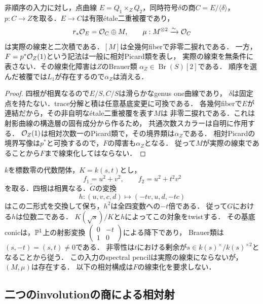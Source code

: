 \begin{lemma}
\label{lem:qa-spectral-relative-pencil-brauer}
非順序の入力に対し，点曲線
$E=Q_1\times_ZQ_2$，同時符号$\delta$の商$C=E/\langle\delta\rangle$，
$p:C\to Z$を取る．$E\to C$は有限\'etale二重被覆であり，
\[
 r_*\mathcal O_E=\mathcal O_C\oplus M,\qquad
 \mu:M^{\otimes2}\xrightarrow{\sim}\mathcal O_C
\]
は実際の線束と二次積である．$[M]$は全幾何fiberで非零二捩れである．
一方，$F=p^*\mathcal O_Z(1)$という記法は一般に相対Picard類を表し，
実際の線束を無条件に表さない．その線束化障害は$Z$のBrauer類
$\alpha_Z\in\operatorname{Br}(S)[2]$である．
順序を選んだ被覆では$L_1$が存在するので$\alpha_Z$は消える．
\end{lemma}
\begin{proof}
四根が相異なるので$E/S,C/S$は滑らかなgenus one曲線であり，
$\delta$は固定点を持たない．trace分解と積は任意基底変更に可換である．
各幾何fiberで$E$が連結だから，その非自明な\'etale二重被覆を表す$M$は
非零二捩れである．これは射影曲線の構造層の固有成分から作るため，
共通次数スカラーは自明に作用する．
$\mathcal O_Z(1)$は相対次数一のPicard類で，その境界類は$\alpha_Z$である．
相対Picardの境界写像は$p^*$と可換するので，$F$の障害も$\alpha_Z$となる．
従って$M$が実際の線束であることから$F$まで線束化してはならない．
\end{proof}

\begin{example}[pencilのBrauer障害が非零になる入力]
\label{ex:qa-spectral-relative-pencil-nonsplit}
$k$を標数零の代数閉体，$K=k(s,t)$とし，
\[
 f_1=u^2+v^2,\qquad f_2=u^2+t^2v^2
\]
を取る．四根は相異なる．$\widetilde G$の変換
\[
 h:(u,v,c,d)\longmapsto(-tv,u,d,-tc)
\]
はこの二形式を交換して保ち，$h^2$は全四変数への$-t$倍である．
従って$G$における$h$は位数二である．
$K(\sqrt{s})/K$と$h$によってこの対象をtwistする．
その基底conicは，$\mathbb P^1$上の射影変換
$\left(\begin{smallmatrix}0&-t\\1&0\end{smallmatrix}\right)$による降下であり，
Brauer類は$(s,-t)=(s,t)\ne0$である．
非零性は$t$における剰余が$s\in k(s)^\times/k(s)^{\times2}$となることから従う．
この入力のspectral pencilは実際の線束にならないが，$(M,\mu)$は存在する．
以下の相対構成は$F$の線束化を要求しない．
\end{example}

\subsection{二つのinvolutionの商による相対射}

